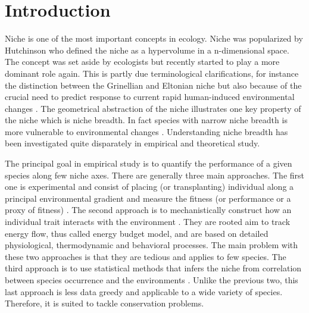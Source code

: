 \section*{Introduction}
Niche is one of the most important concepts in ecology.
Niche was popularized by Hutchinson \citet{Hutchinson1957} who defined the niche as a hypervolume in a n-dimensional space.
The concept was set aside by ecologists but recently started to play a more dominant role again.%
This is partly due terminological clarifications, for instance the distinction between the Grinellian and Eltonian niche \citep{Chase2003} but also because of the crucial need to predict response to current rapid human-induced environmental changes \citep[e.g.,][]{Kearney2009}.
The geometrical abstraction of the niche illustrates one key property of the niche which is niche breadth.
In fact species with narrow niche breadth is more vulnerable to environmental changes \citep{Henle2006}.
Understanding niche breadth has been investigated quite disparately in empirical and theoretical study.

The principal goal in empirical study is to quantify the performance of a given species along few niche axes.
There are generally three main approaches.
The first one is experimental and consist of placing (or transplanting) individual along a principal environmental gradient and measure the fitness (or performance or a proxy of fitness) \citep{Birch1953, Elliot1982,Angert2006,Frazier2006}.
The second approach is to mechanistically construct how an individual trait interacts with the environment \citep{Kooijiman2009, Kearney2009, Buckley2009}.%
They are rooted aim to track energy flow, thus called energy budget model, and are based on detailed physiological, thermodynamic and behavioral processes. 
The main problem with these two approaches is that they are tedious and applies to few species.
The third approach is to use statistical methods that infers the niche from correlation between species occurrence and the environments \citep{Guissan2005, Austin2006, Elith2009}. %
Unlike the previous two, this last approach is less data greedy and applicable to a wide variety of species.
Therefore, it is suited to tackle conservation problems.
 
